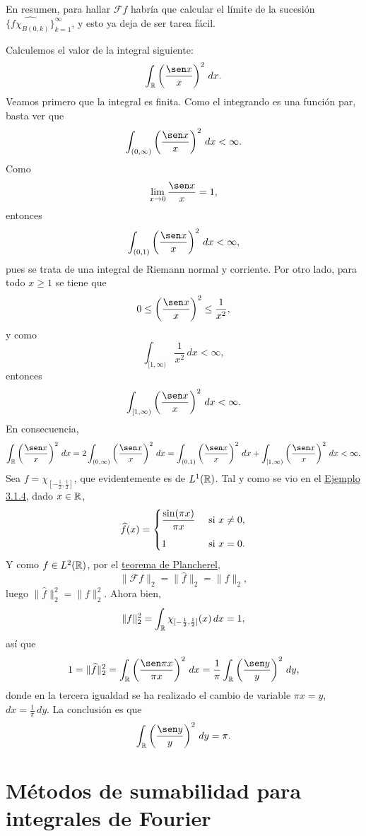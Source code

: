 \documentclass[a4paper, 11pt, oneside]{report}
\begin{document}
En resumen, para hallar $\mathcal{F}f$ habría que calcular el límite de la sucesión $\{\widehat{f\chi_{B(0,k)}}\}_{k=1}^\infty$, y esto ya deja de ser tarea fácil.

\begin{example}
  Calculemos el valor de la integral siguiente:
  \[\int_\R\left(\frac{\sen x}{x}\right)^2 \, dx.\]
  Veamos primero que la integral es finita. Como el integrando es una función par, basta ver que
  \[\int_{(0,\infty)}\left(\frac{\sen x}{x}\right)^2 \, dx < \infty.\]
  Como 
  \[\lim_{x \to 0} \frac{\sen x}{x} = 1,\]
  entonces
  \[\int_{(0,1)}\left(\frac{\sen x}{x}\right)^2 \, dx < \infty,\]
  pues se trata de una integral de Riemann normal y corriente. Por otro lado, para todo $x \geq 1$ se tiene que
  \[0 \leq \left(\frac{\sen x}{x}\right)^2  \leq \frac{1}{x^2},\]
  y como
  \[\int_{[1,\infty)} \frac{1}{x^2} \, dx < \infty,\]
  entonces
  \[\int_{[1,\infty)} \left(\frac{\sen x}{x}\right)^2 \, dx < \infty.\]
  En consecuencia,
  \[\int_\R\left(\frac{\sen x}{x}\right)^2 \, dx = 2\int_{(0,\infty)} \left(\frac{\sen x}{x}\right)^2 \, dx = \int_{(0,1)} \left(\frac{\sen x}{x}\right)^2 \, dx + \int_{[1,\infty)} \left(\frac{\sen x}{x}\right)^2 \, dx < \infty.\]
  Sea $f = \chi_{[-\frac{1}{2},\frac{1}{2}]}$, que evidentemente es de $L^1(\mathbb R)$. Tal y como se vio en el \hyperref[eje:3.1.4]{\color{c1}Ejemplo 3.1.4}, dado $x \in \mathbb R$,
  \[\widehat{f}(x) = \begin{cases}
    \displaystyle \frac{\sin(\pi x)}{\pi x} & $ si $ x \neq 0, \\[10pt]
    1 & $ si $ x = 0.
  \end{cases}\]
  Y como $f \in L^2(\mathbb R)$, por el \hyperref[teo:3.3.4]{\color{c1}teorema de Plancherel}, \[\|\mathcal{F}f\|_2 = \|\widehat{f}\|_2 = \|f\|_2,\]
  luego $\|\widehat{f}\|_2^2 = \|f\|_2^2$. Ahora bien,
  \[\|f\|_2^2 = \int_\mathbb R \chi_{[-\frac{1}{2},\frac{1}{2}]}(x) \, dx = 1,\]
  así que
  \[1 = \|\widehat{f}\|_2^2 = \int_\R \left(\frac{\sen \pi x}{\pi x}\right)^2 \, dx = \frac{1}{\pi} \int_\R \left(\frac{\sen y}{y}\right)^2 \, dy,\]
  donde en la tercera igualdad se ha realizado el cambio de variable $\pi x = y$, $dx = \frac{1}{\pi} \, dy$. La conclusión es que
  \[\int_\R \left(\frac{\sen y}{y}\right)^2 \, dy = \pi.\]
\end{example}

\section{Métodos de sumabilidad para integrales de Fourier}
\end{document}
